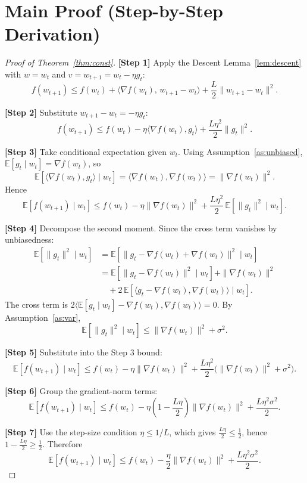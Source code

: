 \documentclass[11pt]{article}
\begin{document}
\section*{Main Proof (Step-by-Step Derivation)}
\begin{proof}[Proof of Theorem~\ref{thm:const}]
\textbf{[Step 1]} Apply the Descent Lemma~\ref{lem:descent} with
$w=w_t$ and $v=w_{t+1}=w_t-\eta g_t$:
\[
f(w_{t+1})\le f(w_t)+\langle\nabla f(w_t),\,w_{t+1}-w_t\rangle
+\frac{L}{2}\|w_{t+1}-w_t\|^2.
\]

\textbf{[Step 2]} Substitute $w_{t+1}-w_t=-\eta g_t$:
\[
f(w_{t+1})\le f(w_t)-\eta\langle\nabla f(w_t),g_t\rangle
+\frac{L\eta^2}{2}\|g_t\|^2.
\]

\textbf{[Step 3]} Take conditional expectation given $w_t$. Using
Assumption~\ref{as:unbiased}, $\mathbb{E}[g_t\mid w_t]=\nabla f(w_t)$, so
\[
\mathbb{E}[\langle\nabla f(w_t),g_t\rangle\mid w_t]
=\langle\nabla f(w_t),\nabla f(w_t)\rangle=\|\nabla f(w_t)\|^2.
\]
Hence
\[
\mathbb{E}[f(w_{t+1})\mid w_t]\le f(w_t)-\eta\|\nabla f(w_t)\|^2
+\frac{L\eta^2}{2}\,\mathbb{E}[\|g_t\|^2\mid w_t].
\]

\textbf{[Step 4]} Decompose the second moment. Since the cross term
vanishes by unbiasedness:
\begin{align*}
\mathbb{E}[\|g_t\|^2\mid w_t]
&=\mathbb{E}[\|g_t-\nabla f(w_t)+\nabla f(w_t)\|^2\mid w_t]\\
&=\mathbb{E}[\|g_t-\nabla f(w_t)\|^2\mid w_t]
+\|\nabla f(w_t)\|^2\\
&\quad+2\,\mathbb{E}[\langle g_t-\nabla f(w_t),\nabla f(w_t)\rangle\mid w_t].
\end{align*}
The cross term is $2\langle\mathbb{E}[g_t\mid w_t]-\nabla f(w_t),\nabla f(w_t)\rangle=0$.
By Assumption~\ref{as:var},
\[
\mathbb{E}[\|g_t\|^2\mid w_t]\le\|\nabla f(w_t)\|^2+\sigma^2.
\]

\textbf{[Step 5]} Substitute into the Step 3 bound:
\[
\mathbb{E}[f(w_{t+1})\mid w_t]
\le f(w_t)-\eta\|\nabla f(w_t)\|^2
+\frac{L\eta^2}{2}\bigl(\|\nabla f(w_t)\|^2+\sigma^2\bigr).
\]

\textbf{[Step 6]} Group the gradient-norm terms:
\[
\mathbb{E}[f(w_{t+1})\mid w_t]
\le f(w_t)-\eta\left(1-\frac{L\eta}{2}\right)\|\nabla f(w_t)\|^2
+\frac{L\eta^2\sigma^2}{2}.
\]

\textbf{[Step 7]} Use the step-size condition $\eta\le 1/L$, which gives
$\frac{L\eta}{2}\le\frac12$, hence $1-\frac{L\eta}{2}\ge\frac12$. Therefore
\[
\mathbb{E}[f(w_{t+1})\mid w_t]
\le f(w_t)-\frac{\eta}{2}\|\nabla f(w_t)\|^2
+\frac{L\eta^2\sigma^2}{2}.
\]


\end{proof}
\end{document}
